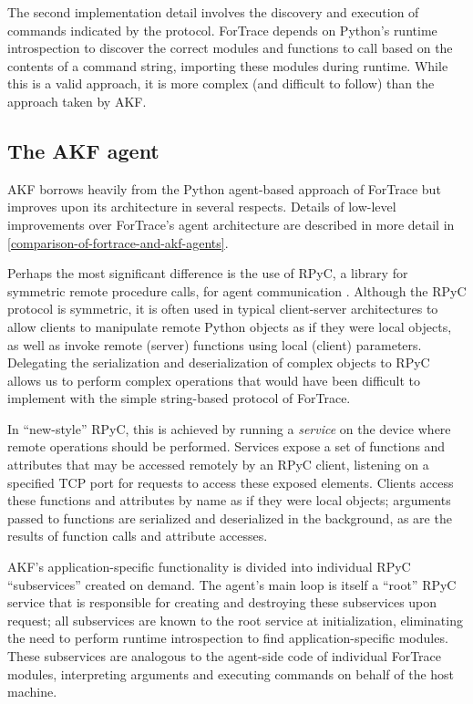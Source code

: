 \documentclass[letterpaper,12pt]{report}
\begin{document}
The second implementation detail involves the discovery and execution of
commands indicated by the protocol. ForTrace depends on Python's runtime
introspection to discover the correct modules and functions to call
based on the contents of a command string, importing these modules
during runtime. While this is a valid approach, it is more complex (and
difficult to follow) than the approach taken by AKF.

\subsection{The AKF agent}\label{the-akf-agent}

AKF borrows heavily from the Python agent-based approach of ForTrace but
improves upon its architecture in several respects. Details of low-level
improvements over ForTrace's agent architecture are described in more
detail in \autoref{comparison-of-fortrace-and-akf-agents}.

Perhaps the most significant difference is the use of RPyC, a library
for symmetric remote procedure calls, for agent communication
\cite{TomerfilibaorgRpyc2025}. Although the RPyC protocol is
symmetric, it is often used in typical client-server architectures to
allow clients to manipulate remote Python objects as if they were local
objects, as well as invoke remote (server) functions using local
(client) parameters. Delegating the serialization and deserialization of
complex objects to RPyC allows us to perform complex operations that
would have been difficult to implement with the simple string-based
protocol of ForTrace.

In ``new-style'' RPyC, this is achieved by running a \emph{service} on
the device where remote operations should be performed. Services expose
a set of functions and attributes that may be accessed remotely by an
RPyC client, listening on a specified TCP port for requests to access
these exposed elements. Clients access these functions and attributes by
name as if they were local objects; arguments passed to functions are
serialized and deserialized in the background, as are the results of
function calls and attribute accesses.

AKF's application-specific functionality is divided into individual RPyC
``subservices'' created on demand. The agent's main loop is itself a
``root'' RPyC service that is responsible for creating and destroying
these subservices upon request; all subservices are known to the root
service at initialization, eliminating the need to perform runtime
introspection to find application-specific modules. These subservices
are analogous to the agent-side code of individual ForTrace modules,
interpreting arguments and executing commands on behalf of the host
machine.
\end{document}
